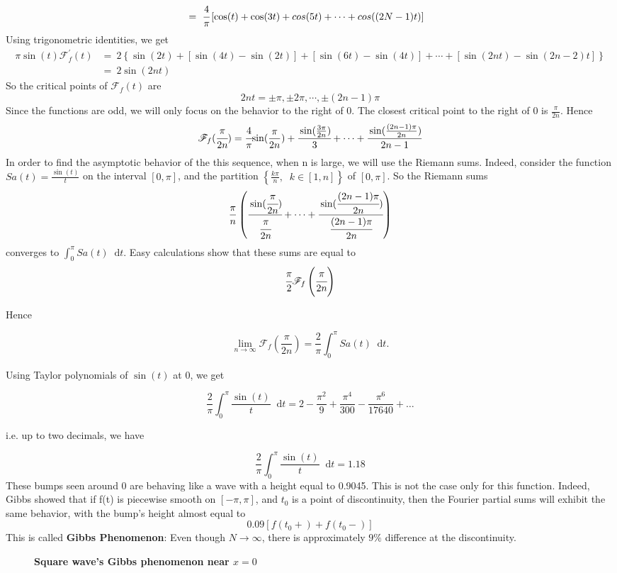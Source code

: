 \documentclass[margin,line]{res}
\newcommand*{\dif}{\mathop{}\!\mathrm{d}}
\begin{document}
\begin{resume}
\begin{align}
	&= \ \cfrac{4}{\pi} \left[ \cos(t) + \cos(3t) + cos(5t) + \cdots + cos((2N-1)t) \right] \nonumber 
\end{align}
Using trigonometric identities, we get 
\begin{align}
\pi\sin(t) \mathscr{F}^{'}_f(t) 
	&= \ 2\left\{ \sin(2t) + \left[\sin(4t)-\sin(2t)\right] + \left[\sin(6t)-\sin(4t)\right] + \cdots + \left[ \sin(2nt)-\sin(2n-2)t \right] \right\} \nonumber \\
	&= \ 2\sin(2nt) \nonumber
\end{align}
So the critical points of $\mathscr{F}_f(t)$ are 
$$
2nt = \pm\pi , \pm 2\pi,\cdots,\pm (2n-1)\pi
$$
Since the functions are odd, we will only focus on the behavior to the right of 0. The closest critical point to the right of 0 is $\frac{\pi}{2n}$. Hence 
$$
\mathscr{F}_f(\cfrac{\pi}{2n}) = \cfrac{4}{\pi} {
	\sin(\frac{\pi}{2n}) + \cfrac{\sin(\frac{3\pi}{2n})}{3} + \cdots +
	\cfrac{\sin(\frac{(2n-1)\pi}{2n})}{2n-1}
}
$$
In order to find the asymptotic behavior of the this sequence, when n is large, we will use the Riemann sums. Indeed, consider the function $Sa(t) = \frac{\sin(t)}{t}$ on the interval $[0,\pi]$, and the partition $\left\{{\frac{k\pi}{n}}, \;\;k \in [1,n]\right\}$ of $[0,\pi]$. So the Riemann sums
$$
\frac{\pi}{n}
\left(
	\cfrac{\sin(\cfrac{\pi}{2n})}{\cfrac{\pi}{2n}} + \cdots +
	\cfrac{\sin(\cfrac{(2n-1)\pi}{2n})}{\cfrac{(2n-1)\pi}{2n}}
\right)
$$
converges to $\int_{0}^{\pi} Sa(t) \dif t$. Easy calculations show that these sums are equal to 
$$
\cfrac{\pi}{2}{\mathscr{F}_f \left( \cfrac{\pi}{2n} \right) }
$$

Hence

$$
\lim_{n \rightarrow \infty} \mathscr{F}_f \left(\frac{\pi}{2n}\right) = \frac{2}{\pi}\int_{0}^{\pi}Sa(t) \dif t.
$$

Using Taylor polynomials of $\sin(t)$ at 0, we get

$$
\frac{2}{\pi}\int_{0}^{\pi}\frac{\sin(t)}{t} \dif t = 2 - \frac{\pi^2}{9} + \frac{\pi^4}{300} - \frac{\pi^6}{17640}+\ldots
$$

i.e. up to two decimals, we have

$$
\frac{2}{\pi}\int_{0}^{\pi}\frac{\sin(t)}{t} \dif t = 1.18
$$
These bumps seen around 0 are behaving like a wave with a height equal to 0.9045. This is not the case only for this function. Indeed, Gibbs showed that if f(t) is piecewise smooth on $[-\pi,\pi]$, and $t_0$ is a point of discontinuity, then the Fourier partial sums will exhibit the same behavior, with the bump's height almost equal to 
$$
0.09\left[ f(t_0+) + f(t_0-)\right]
$$
This is called \textbf{Gibbs Phenomenon}: Even though $N \rightarrow \infty$, there is approximately $9\%$ difference at the discontinuity.
\begin{figure}[H]
	\centerline{\textbf{Square wave's Gibbs phenomenon near $x=0$}}
	\centerline{}
\end{figure}
\clearpage


\end{resume}
\end{document}
